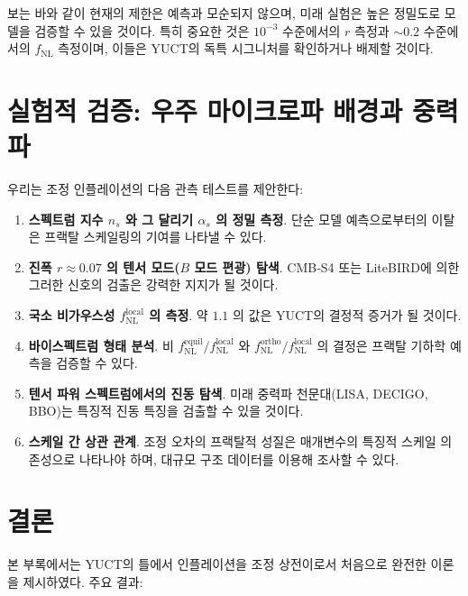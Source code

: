 \documentclass[11pt,a4paper]{article}
\theoremstyle{remark}
\begin{document}
	보는 바와 같이 현재의 제한은 예측과 모순되지 않으며, 미래 실험은 높은 정밀도로 모델을 검증할 수 있을 것이다. 특히 중요한 것은 $10^{-3}$ 수준에서의 $r$ 측정과 $\sim 0.2$ 수준에서의 $f_{\text{NL}}$ 측정이며, 이들은 YUCT의 독특 시그니처를 확인하거나 배제할 것이다.
	
	\section{실험적 검증: 우주 마이크로파 배경과 중력파}
	\label{sec:tests}
	
	우리는 조정 인플레이션의 다음 관측 테스트를 제안한다:
	
	\begin{enumerate}
		\item \textbf{스펙트럼 지수 $n_s$ 와 그 달리기 $\alpha_s$ 의 정밀 측정}. 단순 모델 예측으로부터의 이탈은 프랙탈 스케일링의 기여를 나타낼 수 있다.
		\item \textbf{진폭 $r \approx 0.07$ 의 텐서 모드($B$ 모드 편광) 탐색}. CMB‑S4 또는 LiteBIRD에 의한 그러한 신호의 검출은 강력한 지지가 될 것이다.
		\item \textbf{국소 비가우스성 $f_{\text{NL}}^{\text{local}}$ 의 측정}. 약 $1.1$ 의 값은 YUCT의 결정적 증거가 될 것이다.
		\item \textbf{바이스펙트럼 형태 분석}. 비 $f_{\text{NL}}^{\text{equil}}/f_{\text{NL}}^{\text{local}}$ 와 $f_{\text{NL}}^{\text{ortho}}/f_{\text{NL}}^{\text{local}}$ 의 결정은 프랙탈 기하학 예측을 검증할 수 있다.
		\item \textbf{텐서 파워 스펙트럼에서의 진동 탐색}. 미래 중력파 천문대(LISA, DECIGO, BBO)는 특징적 진동 특징을 검출할 수 있을 것이다.
		\item \textbf{스케일 간 상관 관계}. 조정 오차의 프랙탈적 성질은 매개변수의 특징적 스케일 의존성으로 나타나야 하며, 대규모 구조 데이터를 이용해 조사할 수 있다.
	\end{enumerate}
	
	\section{결론}
	\label{sec:conclusion}
	
	본 부록에서는 YUCT의 틀에서 인플레이션을 조정 상전이로서 처음으로 완전한 이론을 제시하였다. 주요 결과:
	
\end{document}

